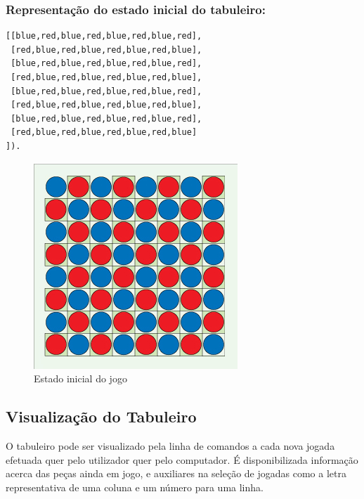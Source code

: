 \documentclass[a4paper]{article}
\begin{document}
\subsubsection{Representação do estado inicial do tabuleiro:}
\begin{verbatim}
[[blue,red,blue,red,blue,red,blue,red],
 [red,blue,red,blue,red,blue,red,blue],
 [blue,red,blue,red,blue,red,blue,red],
 [red,blue,red,blue,red,blue,red,blue],
 [blue,red,blue,red,blue,red,blue,red],
 [red,blue,red,blue,red,blue,red,blue],
 [blue,red,blue,red,blue,red,blue,red],
 [red,blue,red,blue,red,blue,red,blue]
]).
\end{verbatim}

\begin{figure}[H]
    \center
    \includegraphics[scale=0.4]{resources/initial-state.jpg}
    \caption{Estado inicial do jogo}
    \label{fig:initial-state.png}
\end{figure}

\subsection{Visualização do Tabuleiro}

O tabuleiro pode ser visualizado pela linha de comandos a cada nova jogada efetuada quer pelo utilizador quer pelo computador.
É disponibilizada informação acerca das peças ainda em jogo, e auxiliares na seleção de jogadas como a letra representativa de uma coluna e um número para uma linha.
\end{document}
